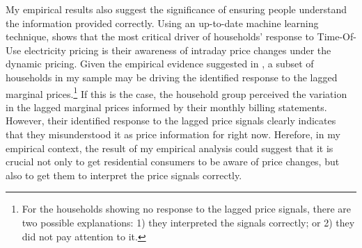My empirical results also suggest the significance of ensuring people understand the information provided correctly. Using an up-to-date machine learning technique, \cite{Peaking-Interest:How-Awareness-Drives-the-Effectiveness-of-Time-of-Use-Electricity-Pricing_Prest_2020} shows that the most critical driver of households' response to Time-Of-Use electricity pricing is their awareness of intraday price changes under the dynamic pricing. Given the empirical evidence suggested in \cite{Misunderstanding-Nonlinear-Prices_2020_(Shaffer)}, a subset of households in my sample may be driving the identified response to the lagged marginal prices.\footnote{For the households showing no response to the lagged price signals, there are two possible explanations: 1) they interpreted the signals correctly; or 2) they did not pay attention to it.} If this is the case, the household group perceived the variation in the lagged marginal prices informed by their monthly billing statements. However, their identified response to the lagged price signals clearly indicates that they misunderstood it as price information for right now. Herefore, in my empirical context, the result of my empirical analysis could suggest that it is crucial not only to get residential consumers to be aware of price changes, but also to get them to interpret the price signals correctly. 
